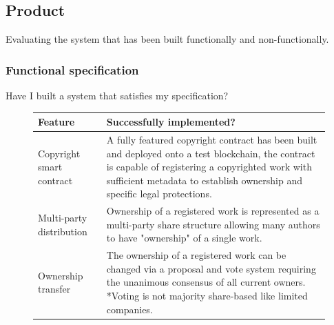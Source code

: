 \subsection{Product}
Evaluating the system that has been built functionally and non-functionally.

\subsubsection{Functional specification}

Have I built a system that satisfies my specification?

\begin{figure}[H]
\caption{success of each functional requirement}
\begin{table}[H]
\begin{tabular}{|p{}|p{}|}
\hline
Feature                         & Successfully implemented?                                                                                                                                                                                                                                                                                                                                                           \\ \hline
Copyright smart contract        & A fully featured copyright contract has been built and deployed onto a test blockchain, the contract is capable of registering a copyrighted work with sufficient metadata to establish ownership and specific legal protections.                                                                                                                                                   \\ \hline
Multi-party distribution        & Ownership of a registered work is represented as a multi-party share structure allowing many authors to have "ownership" of a single work.                                                                                                                                                                                                                                          \\ \hline
Ownership transfer              & The ownership of a registered work can be changed via a proposal and vote system requiring the unanimous consensus of all current owners. *Voting is not majority share-based like limited companies.                                                                                                                                                                               \\ \hline

\end{tabular}
\end{table}
\end{figure}
